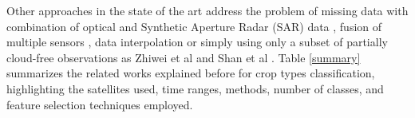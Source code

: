 \documentclass[journal,article,submit,pdftex,moreauthors]{Definitions/mdpi}
\begin{document}

Other approaches in the state of the art address the problem of missing data with combination of optical and Synthetic Aperture Radar (SAR) data \cite{Begue2018, Orynbaikyzy2019, Kussul2017, Tariq2022}, 
fusion of multiple sensors \cite{PierrePott2022, Heupel2018,MorenoMartinez2020}, data interpolation \cite{Russwurm2020, Kandasamy2013} or simply using only a subset of partially cloud-free observations as Zhiwei et al \cite{Yi2020} and Shan et al \cite{He2022}. Table \ref{summary} summarizes the related works explained before for crop types classification, highlighting the satellites used, time ranges, methods, number of classes, and feature selection techniques employed.
\end{document}
